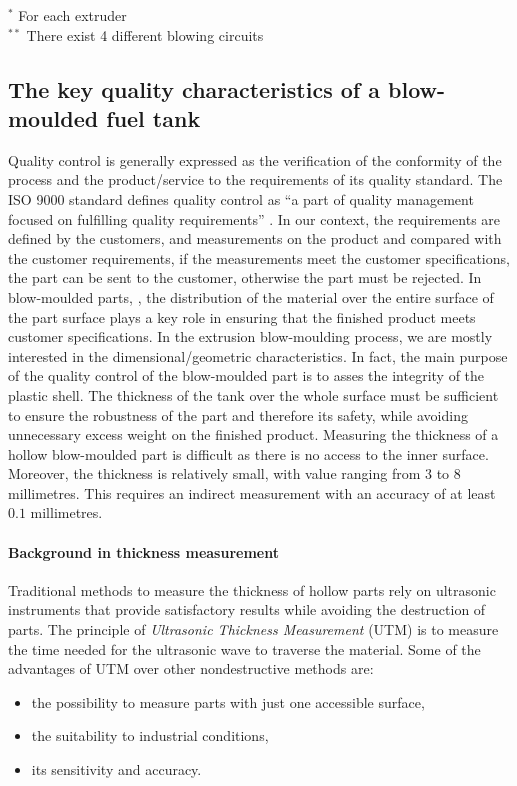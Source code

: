 \begin{landscape}
\begin{table}[]
\footnotesize{%
\noindent
$^*$ For each extruder \\
\noindent
$^{**}$ There exist 4 different blowing circuits}\\
\end{table}
\end{landscape}

\subsection{The key quality characteristics of a blow-moulded fuel tank} \label{The key quality characteristics of a blow-moulded fuel tank}

Quality control is generally expressed as  the verification of the conformity of the process and the product/service to the requirements of its quality standard. The ISO 9000 standard defines quality control as ``a part of quality management focused on fulfilling quality requirements'' \citep{iso9000}. In our context, the requirements are defined by the customers, and measurements on the product and compared with the customer requirements, if the measurements meet the customer specifications, the part can be sent to the customer, otherwise the part must be rejected. In blow-moulded parts, , the distribution of the material over the entire surface of the part surface plays a key role in ensuring that the finished product meets customer specifications. In the extrusion blow-moulding process, we are mostly interested in the dimensional/geometric characteristics. In fact, the main purpose of the quality control of the blow-moulded part is to asses the integrity of the plastic shell. The thickness of the tank over the whole surface must be sufficient to ensure the robustness of the part and therefore its safety, while avoiding unnecessary excess weight on the finished product. Measuring the thickness of a hollow blow-moulded part is difficult as there is no access to the inner surface. Moreover, the thickness is relatively small, with value ranging from $3$ to $8$ millimetres. This requires an indirect measurement with an accuracy of at least $0.1$ millimetres.

\paragraph{Background in thickness measurement}

Traditional methods to measure the thickness of hollow parts rely on ultrasonic instruments that provide satisfactory results while avoiding the destruction of parts. The principle of \textit{Ultrasonic Thickness Measurement} (UTM) is to measure the time needed for the ultrasonic wave to traverse the material. Some of the advantages of UTM over other nondestructive methods are:
\begin{itemize}
    \item the possibility to measure parts with just one accessible surface,
    \item the suitability to industrial conditions,
    \item its sensitivity and accuracy.
\end{itemize}
 

